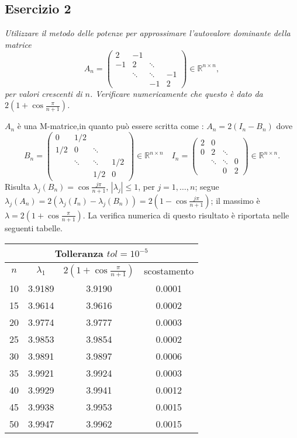 \subsection{Esercizio 2}
\label{sub:Es2}
\emph{
      Utilizzare il metodo delle potenze per approssimare l'autovalore dominante della matrice
			\[
				A_n=\begin{pmatrix}
					2 & -1 & &\\
					-1 & 2 & \ddots &\\
					& \ddots & \ddots & -1\\
					& & -1 & 2
				\end{pmatrix}\in\mathbb{R}^{n\times n},
			\]
			per valori crescenti di $n$. Verificare numericamente che questo è dato da $2\left(1+\cos\frac{\pi}{n+1}\right)$.
}
\begin{sol}
  \normalfont
  $A_n$ è una M-matrice,in quanto può essere scritta come : $A_n=2(I_n-B_n)$ dove
  $$B_n=\begin{pmatrix}0&1/2&&\\1/2&0&\ddots&\\&\ddots&\ddots&1/2\\&&1/2&0\end{pmatrix}\in\mathbb{R}^{n\times n} \quad I_n=\begin{pmatrix}2&0&&\\0&2&\ddots&\\&\ddots&\ddots&0\\&&0&2\end{pmatrix}\in\mathbb{R}^{n\times n}.$$
  Risulta $\lambda_j(B_n)=\cos{\frac{j\pi}{n+1}}$, $|\lambda_j|\leq 1$, per $j=1,\ldots,n$;
  segue $\lambda_j(A_n)=2(\lambda_j(I_n)-\lambda_j(B_n))=2(1-\cos{\frac{j\pi}{n+1}})$; il massimo è $\lambda=2(1+\cos{\frac{\pi}{n+1}})$.
  La verifica numerica di questo risultato è riportata nelle seguenti tabelle.
  \begin{center}\begin{tabular}{c|c|c|c}
    \hline\multicolumn{4}{c}{Tolleranza $tol=10^{-5}$}\\\hline
    $n$ & $\lambda_1$ & $2\left(1+\cos{\frac{\pi}{n+1}}\right)$ & scostamento\\\hline
    10 & 3.9189 & 3.9190 & 0.0001 \\
    15 & 3.9614 & 3.9616 & 0.0002 \\
    20 & 3.9774 & 3.9777 & 0.0003 \\
    25 & 3.9853 & 3.9854 & 0.0002 \\
    30 & 3.9891 & 3.9897 & 0.0006 \\
    35 & 3.9921 & 3.9924 & 0.0003 \\
    40 & 3.9929 & 3.9941 & 0.0012 \\
    45 & 3.9938 & 3.9953 & 0.0015 \\
    50 & 3.9947 & 3.9962 & 0.0015
  \end{tabular}\end{center}


\end{sol}
